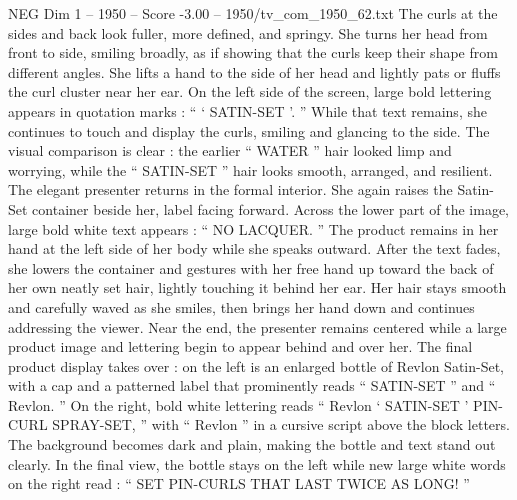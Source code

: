 \begin{textsample}{NEG Dim 1 – 1950 – Score -3.00 – 1950/tv\_com\_1950\_62.txt}
The curls at the sides and back look fuller, more defined, and springy.
She turns her head from front to side, smiling broadly, as if showing that the curls keep their shape from different angles.
She lifts a hand to the side of her head and lightly pats or fluffs the curl cluster near her ear.
On the left side of the screen, large bold lettering appears in quotation marks : “ ‘ SATIN-SET ’. ” While that text remains, she continues to touch and display the curls, smiling and glancing to the side.
The visual comparison is clear : the earlier “ WATER ” hair looked limp and worrying, while the “ SATIN-SET ” hair looks smooth, arranged, and resilient.
The elegant presenter returns in the formal interior.
She again raises the Satin-Set container beside her, label facing forward.
Across the lower part of the image, large bold white text appears : “ NO LACQUER. ” The product remains in her hand at the left side of her body while she speaks outward.
After the text fades, she lowers the container and gestures with her free hand up toward the back of her own neatly set hair, lightly touching it behind her ear.
Her hair stays smooth and carefully waved as she smiles, then brings her hand down and continues addressing the viewer.
Near the end, the presenter remains centered while a large product image and lettering begin to appear behind and over her.
The final product display takes over : on the left is an enlarged bottle of Revlon Satin-Set, with a cap and a patterned label that prominently reads “ SATIN-SET ” and “ Revlon. ” On the right, bold white lettering reads “ Revlon ‘ SATIN-SET ’ PIN-CURL SPRAY-SET, ” with “ Revlon ” in a cursive script above the block letters.
The background becomes dark and plain, making the bottle and text stand out clearly.
In the final view, the bottle stays on the left while new large white words on the right read : “ SET PIN-CURLS THAT LAST TWICE AS LONG! ”

\end{textsample}
